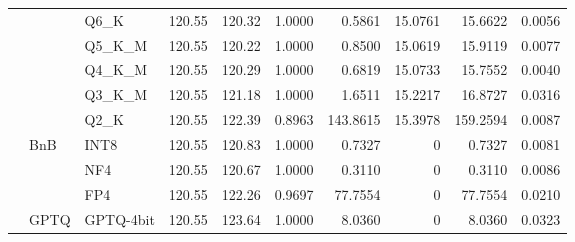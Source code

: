 \begin{longtable}{ll l rrrrrrr}
 &  & Q6\_K & 120.55 & 120.32 & 1.0000 & 0.5861 & 15.0761 & 15.6622 & 0.0056 \\
 &  & Q5\_K\_M & 120.55 & 120.22 & 1.0000 & 0.8500 & 15.0619 & 15.9119 & 0.0077 \\
 &  & Q4\_K\_M & 120.55 & 120.29 & 1.0000 & 0.6819 & 15.0733 & 15.7552 & 0.0040 \\
 &  & Q3\_K\_M & 120.55 & 121.18 & 1.0000 & 1.6511 & 15.2217 & 16.8727 & 0.0316 \\
 &  & Q2\_K & 120.55 & 122.39 & \cellcolor{red!18} 0.8963 & \cellcolor{red!18} 143.8615 & 15.3978 & \cellcolor{red!18} 159.2594 & \cellcolor{red!18} 0.0087 \\
 & BnB & INT8 & 120.55 & 120.83 & 1.0000 & 0.7327 & \cellcolor{cyan!12} $0$ & 0.7327 & 0.0081 \\
 &  & NF4 & 120.55 & 120.67 & 1.0000 & 0.3110 & \cellcolor{cyan!12} $0$ & 0.3110 & 0.0086 \\
 &  & FP4 & 120.55 & 122.26 & 0.9697 & 77.7554 & \cellcolor{cyan!12} $0$ & 77.7554 & 0.0210 \\
 & GPTQ & GPTQ-4bit & 120.55 & 123.64 & 1.0000 & 8.0360 & \cellcolor{cyan!12} $0$ & 8.0360 & 0.0323 \\
\end{longtable}
\endgroup